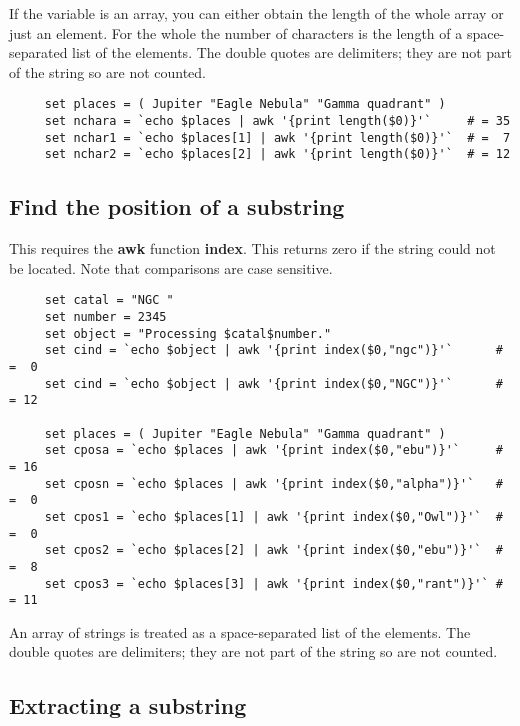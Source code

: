 If the variable is an array, you can either obtain the length of the
whole array or just an element.  For the whole the number of
characters is the length of a space-separated list of the elements.
The double quotes are delimiters; they are not part of the string so
are not counted.

\small
\begin{verbatim}
     set places = ( Jupiter "Eagle Nebula" "Gamma quadrant" )
     set nchara = `echo $places | awk '{print length($0)}'`     # = 35
     set nchar1 = `echo $places[1] | awk '{print length($0)}'`  # =  7
     set nchar2 = `echo $places[2] | awk '{print length($0)}'`  # = 12
\end{verbatim}
\normalsize

\subsection{Find the position of a
substring\label{sc4_se_string_substr}}

This requires the {\bf awk} function {\bf index}.  This returns zero if
the string could not be located.  Note that comparisons are case
sensitive.

\small
\begin{verbatim}
     set catal = "NGC "
     set number = 2345
     set object = "Processing $catal$number."
     set cind = `echo $object | awk '{print index($0,"ngc")}'`      # =  0
     set cind = `echo $object | awk '{print index($0,"NGC")}'`      # = 12

     set places = ( Jupiter "Eagle Nebula" "Gamma quadrant" )
     set cposa = `echo $places | awk '{print index($0,"ebu")}'`     # = 16
     set cposn = `echo $places | awk '{print index($0,"alpha")}'`   # =  0
     set cpos1 = `echo $places[1] | awk '{print index($0,"Owl")}'`  # =  0
     set cpos2 = `echo $places[2] | awk '{print index($0,"ebu")}'`  # =  8
     set cpos3 = `echo $places[3] | awk '{print index($0,"rant")}'` # = 11
\end{verbatim}
\normalsize
An array of strings is treated as a space-separated list of the elements.
The double quotes are delimiters; they are not part of the string so
are not counted.

\newpage
\subsection{Extracting a substring
\label{sc4_se_string_ex_substr}}

